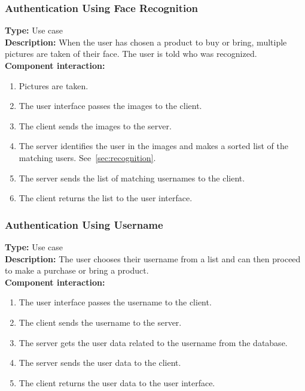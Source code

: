 \documentclass[11pt]{article}
\begin{document}
\subsubsection{Authentication Using Face Recognition}
\textbf{Type:} Use case\\
\textbf{Description:} When the user has chosen a product to buy or bring, 
multiple pictures are taken of their face. The user is told who was recognized. \\
\textbf{Component interaction:} 
\begin{enumerate} 
\item{Pictures are taken.}
\item{The user interface passes the images to the client.}
\item{The client sends the images to the server.}
\item{The server identifies the user in the images and makes a sorted list of the matching users. See~\ref{sec:recognition}.}
\item{The server sends the list of matching usernames to the client.}
\item{The client returns the list to the user interface.}
\end{enumerate}

\subsubsection{Authentication Using Username}
\textbf{Type:} Use case\\
\textbf{Description:} The user chooses their username from a list and can then proceed to make a purchase or bring a product.\\
\textbf{Component interaction:} 
\begin{enumerate} 
\item{The user interface passes the username to the client.}
\item{The client sends the username to the server.}
\item{The server gets the user data related to the username from the database.}
\item{The server sends the user data to the client.}
\item{The client returns the user data to the user interface.}
\end{enumerate}
\end{document}
